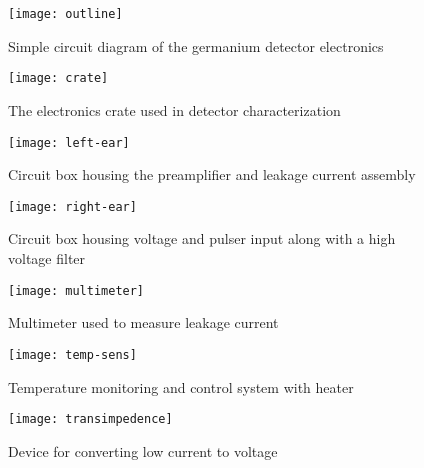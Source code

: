\begin{figure}[htpb]
\centering
\texttt{[image: outline]}
\caption{Simple circuit diagram of the germanium detector electronics}
\label{fig:outline}
\end{figure}

\begin{figure}[htpb]
\centering
\texttt{[image: crate]}
\caption{The electronics crate used in detector characterization}
\label{fig:crate}
\end{figure}

\begin{figure}[htpb]
\centering
\texttt{[image: left-ear]}
\caption{Circuit box housing the preamplifier and leakage current assembly}
\label{fig:left-ear}
\end{figure}

\begin{figure}[htpb]
\centering
\texttt{[image: right-ear]}
\caption{Circuit box housing voltage and pulser input along with a high voltage filter}
\end{figure}

\begin{figure}[htpb]
\centering
\texttt{[image: multimeter]}
\caption{Multimeter used to measure leakage current}
\label{fig:multimeter}
\end{figure}

\begin{figure}[htpb]
\centering
\texttt{[image: temp-sens]}
\caption{Temperature monitoring and control system with heater}
\label{fig:temp-sens}
\end{figure}

\begin{figure}[htpb]
\centering
\texttt{[image: transimpedence]}
\caption{Device for converting low current to voltage}
\label{fig:transimpedence}
\end{figure}

